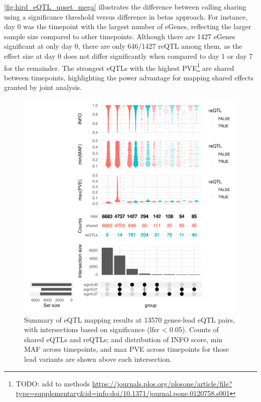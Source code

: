 \autoref{fig:hird_eQTL_upset_mega} illustrates the difference between calling sharing using a significance threshold versus difference in betas approach.
For instance, day 0 was the timepoint with the largest number of eGenes, reflecting the larger sample size compared to other timepoints.
Although there are 1427 eGenes significant at only day 0, there are only 646/1427 reQTL among them, as the effect size at day 0 does not differ significantly when compared to day 1 or day 7 for the remainder.
The strongest \glspl{eQTL} with the highest \gls{PVE}\footnote{TODO: add to methods \url{https://journals.plos.org/plosone/article/file?type=supplementary&id=info:doi/10.1371/journal.pone.0120758.s001}}
are shared between timepoints, highlighting the power advantage for mapping shared effects granted by joint analysis.

\begin{figure}
    \centering
    \includegraphics[width=1.0\textwidth]{mainmatter/figures/chapter_03/compare_dge_eqtl.upset.pdf}
    \caption{
        Summary of eQTL mapping results at 13570 genes-lead eQTL pairs,
        with intersections based on significance (lfsr < 0.05).
        Counts of shared eQTLs and reQTLs; and distribution of INFO score, min MAF across timepoints, and max PVE across timepoints for those lead variants are shown above each intersection.
    }
    \label{fig:hird_eQTL_upset_mega}
\end{figure}

